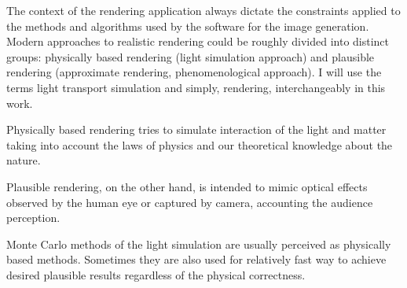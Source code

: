 The context of the rendering application always dictate the constraints applied to the methods and
algorithms used by the software for the image generation.
Modern approaches to realistic rendering could be roughly divided into distinct groups:
physically based rendering (light simulation approach) and plausible rendering (approximate
rendering, phenomenological approach). I will use the terms light transport simulation and simply,
rendering, interchangeably in this work.

Physically based rendering tries to simulate interaction of the light and matter taking into account
the laws of physics and our theoretical knowledge about the nature.

Plausible rendering, on the other hand, is intended to mimic optical effects observed by the human
eye or captured by camera, accounting the audience perception.

Monte Carlo methods of the light simulation are usually perceived as physically based methods.
Sometimes they are also used for relatively fast way to achieve desired plausible results regardless
of the physical correctness.